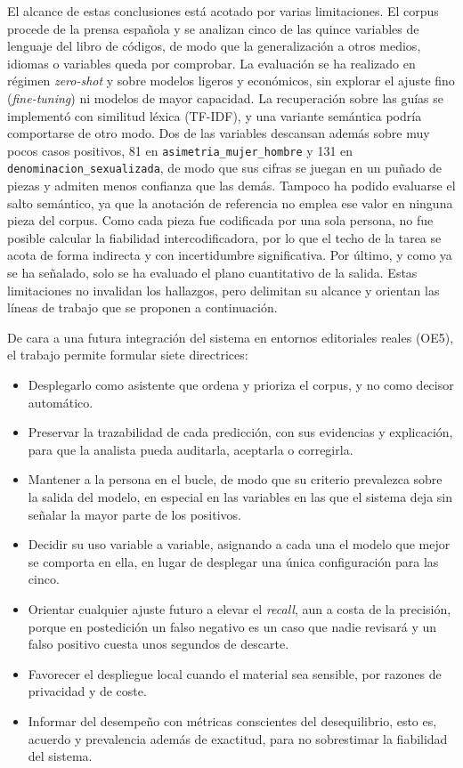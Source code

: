 El alcance de estas conclusiones está acotado por varias limitaciones. El corpus
procede de la prensa española y se analizan cinco de las quince variables de lenguaje
del libro de códigos, de modo que la generalización a otros medios, idiomas o variables
queda por comprobar. La evaluación se ha realizado en régimen \textit{zero-shot} y
sobre modelos ligeros y económicos, sin explorar el ajuste fino (\textit{fine-tuning})
ni modelos de mayor capacidad. La recuperación sobre las guías se implementó con similitud léxica (TF-IDF),
y una variante semántica podría comportarse de otro modo. Dos de las variables
descansan además sobre muy pocos casos positivos, 81 en
\texttt{asimetria\_mujer\_hombre} y 131 en \texttt{denominacion\_sexualizada}, de modo
que sus cifras se juegan en un puñado de piezas y admiten menos confianza que las
demás. Tampoco ha podido evaluarse el salto semántico, ya que la anotación de
referencia no emplea ese valor en ninguna pieza del corpus. Como cada pieza fue
codificada por una sola persona, no fue posible calcular la fiabilidad
intercodificadora, por lo que el techo de la tarea se acota de forma indirecta y con incertidumbre significativa.
Por último, y como ya se ha señalado, solo se ha evaluado el plano cuantitativo de la
salida. Estas limitaciones no invalidan los hallazgos, pero delimitan su alcance y
orientan las líneas de trabajo que se proponen a continuación.

De cara a una futura integración del sistema en entornos editoriales reales (OE5), el
trabajo permite formular siete directrices:
\begin{itemize}
    \item Desplegarlo como asistente que ordena y prioriza el corpus, y no como decisor
    automático.
    \item Preservar la trazabilidad de cada predicción, con sus evidencias y explicación,
    para que la analista pueda auditarla, aceptarla o corregirla.
    \item Mantener a la persona en el bucle, de modo que su criterio prevalezca sobre la
    salida del modelo, en especial en las variables en las que el sistema deja sin
    señalar la mayor parte de los positivos.
    \item Decidir su uso variable a variable, asignando a cada una el modelo que mejor se
    comporta en ella, en lugar de desplegar una única configuración para las cinco.
    \item Orientar cualquier ajuste futuro a elevar el \textit{recall}, aun a costa de la
    precisión, porque en postedición un falso negativo es un caso que nadie revisará y
    un falso positivo cuesta unos segundos de descarte.
    \item Favorecer el despliegue local cuando el material sea sensible, por razones de
    privacidad y de coste.
    \item Informar del desempeño con métricas conscientes del desequilibrio, esto es, acuerdo
    y prevalencia además de exactitud, para no sobrestimar la fiabilidad del sistema.
\end{itemize}
